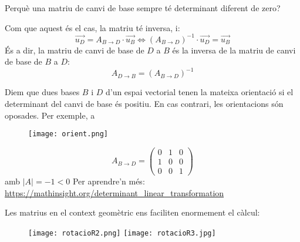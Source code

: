 \documentclass{beamer}
\begin{document}
\begin{frame}
  \begin{exercici}{}
    Perquè una matriu de canvi de base sempre té determinant diferent de zero?
  \end{exercici}

  Com que aquest és el cas, la matriu té inversa, i:
  \[
    \overrightarrow{u_D}= A_{B \rightarrow D} \cdot \overrightarrow{u_B} \Leftrightarrow (A_{B \rightarrow D})^{-1} \cdot  \overrightarrow{u_D}=  \overrightarrow{u_B}
  \]
  És a dir, la matriu de canvi de base de $D$ a $B$ és la inversa de la matriu de canvi de base de $B$ a $D$:
  \[
    A_{D \rightarrow B} = (A_{B \rightarrow D})^{-1}
  \]
\end{frame}
\begin{frame}
  Diem que dues bases $B$ i $D$ d'un espai vectorial tenen la mateixa orientació si el determinant del canvi de base és positiu. En cas contrari, les orientacions són oposades. Per exemple, a
  \begin{figure}
    \texttt{[image: orient.png]}
  \end{figure}
  \[
    A_{B \rightarrow D} = \begin{pmatrix}0&1&0\\1&0&0\\0&0&1\end{pmatrix}
  \]
  amb $|A|=-1<0$
  Per aprendre'n més: \url{https://mathinsight.org/determinant_linear_transformation}
\end{frame}


\begin{frame}
  Les matrius en el context geomètric ens faciliten enormement el càlcul:
  \begin{figure}
  \texttt{[image: rotacioR2.png]}
  \texttt{[image: rotacioR3.jpg]}
  \end{figure}
\end{frame}
\end{document}
